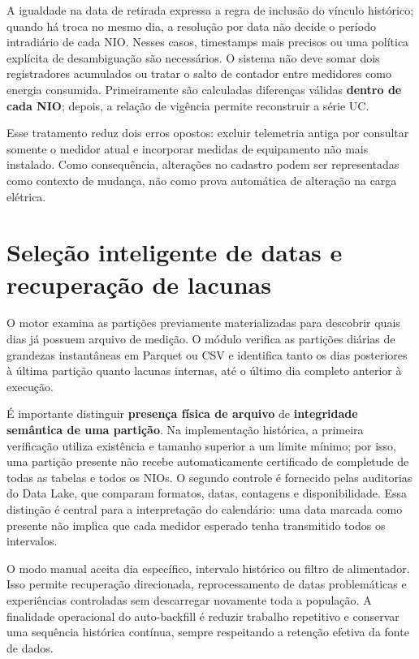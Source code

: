A igualdade na data de retirada expressa a regra de inclusão do vínculo histórico; quando há troca no mesmo dia, a resolução por data não decide o período intradiário de cada NIO. Nesses casos, timestamps mais precisos ou uma política explícita de desambiguação são necessários. O sistema não deve somar dois registradores acumulados ou tratar o salto de contador entre medidores como energia consumida. Primeiramente são calculadas diferenças válidas \textbf{dentro de cada NIO}; depois, a relação de vigência permite reconstruir a série UC.

Esse tratamento reduz dois erros opostos: excluir telemetria antiga por consultar somente o medidor atual e incorporar medidas de equipamento não mais instalado. Como consequência, alterações no cadastro podem ser representadas como contexto de mudança, não como prova automática de alteração na carga elétrica.

\section{Seleção inteligente de datas e recuperação de lacunas}\label{seleuxe7uxe3o-inteligente-de-datas-e-recuperauxe7uxe3o-de-lacunas}

O motor examina as partições previamente materializadas para descobrir quais dias já possuem arquivo de medição. O módulo verifica as partições diárias de grandezas instantâneas em Parquet ou CSV e identifica tanto os dias posteriores à última partição quanto lacunas internas, até o último dia completo anterior à execução.

É importante distinguir \textbf{presença física de arquivo} de \textbf{integridade semântica de uma partição}. Na implementação histórica, a primeira verificação utiliza existência e tamanho superior a um limite mínimo; por isso, uma partição presente não recebe automaticamente certificado de completude de todas as tabelas e todos os NIOs. O segundo controle é fornecido pelas auditorias do Data Lake, que comparam formatos, datas, contagens e disponibilidade. Essa distinção é central para a interpretação do calendário: uma data marcada como presente não implica que cada medidor esperado tenha transmitido todos os intervalos.

O modo manual aceita dia específico, intervalo histórico ou filtro de alimentador. Isso permite recuperação direcionada, reprocessamento de datas problemáticas e experiências controladas sem descarregar novamente toda a população. A finalidade operacional do auto-backfill é reduzir trabalho repetitivo e conservar uma sequência histórica contínua, sempre respeitando a retenção efetiva da fonte de dados.

